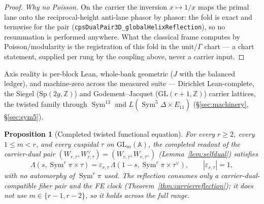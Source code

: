 \documentclass[11pt]{article}
\newtheorem{proposition}[theorem]{Proposition}
\theoremstyle{definition}
\newcommand{\Sym}{\operatorname{Sym}}
\begin{document}
\begin{proof}
\emph{Why no Poisson.} On the carrier the inversion $x\mapsto1/x$ maps the primal lane onto the
reciprocal-height anti-lane phasor by phasor: the fold is exact and termwise for the pair
(\texttt{cpsDualPair3D\_globalHelixReflection}), so no resummation is performed anywhere.  What the
classical frame computes by Poisson/modularity is the registration of this fold in the unit/$\Gamma$
chart --- a chart statement, supplied per rung by the coupling above, never a carrier input.
\end{proof}

\noindent Axis reality is per-block Lean, whole-bank
geometric ($J$ with the balanced ledger), and machine-zero across the measured suite --- Dirichlet
Lean-complete, the Siegel ($\mathrm{Sp}(2g,\mathbb Z)$) and Godement--Jacquet
($\mathrm{GL}(r{+}1,\mathbb Z)$) carrier lattices, the twisted family through $\Sym^{13}$ and
$L(\Sym^5\Delta\times E_{11})$ (\S\ref{sec:machinery}, \S\ref{sec:sym5}).

\begin{proposition}[Completed twisted functional equation]\label{prop:completedFE}
For every $r\ge2$, every $1\le m<r$, and every cuspidal $\tau$ on $\mathrm{GL}_m(\mathbb A)$, the completed
readout of the carrier-dual pair $(W_{r,\tau},W_{r,\tau}^\vee)=(W_{r,\tau},W_{r,\tau^\vee})$
(Lemma~\ref{lem:selfdual}) satisfies
\[
  \Lambda(s,\Sym^r\pi\times\tau)=\varepsilon_{r,\tau}\,\Lambda(1-s,\Sym^r\pi\times\tau^\vee),
  \qquad |\varepsilon_{r,\tau}|=1,
\]
with no automorphy of $\Sym^r\pi$ used. The reflection consumes only a carrier-dual-compatible fiber pair and
the FE clock (Theorem~\ref{thm:carrierreflection}); it does not use $m\in\{r-1,r-2\}$, so it holds across the
full range.
\end{proposition}
\end{document}
